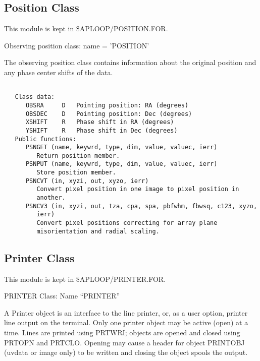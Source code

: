 \subsection{Position Class}

   This module is kept in \$APLOOP/POSITION.FOR.

   Observing position class: name = 'POSITION'

   The observing position class contains information about the
original position and any phase center shifts of the data.
{\small\begin{verbatim}

   Class data:
      OBSRA     D   Pointing position: RA (degrees)
      OBSDEC    D   Pointing position: Dec (degrees)
      XSHIFT    R   Phase shift in RA (degrees)
      YSHIFT    R   Phase shift in Dec (degrees)
   Public functions:
      PSNGET (name, keywrd, type, dim, value, valuec, ierr)
         Return position member.
      PSNPUT (name, keywrd, type, dim, value, valuec, ierr)
         Store position member.
      PSNCVT (in, xyzi, out, xyzo, ierr)
         Convert pixel position in one image to pixel position in
         another.
      PSNCV3 (in, xyzi, out, tza, cpa, spa, pbfwhm, fbwsq, c123, xyzo,
         ierr)
         Convert pixel positions correcting for array plane
         misorientation and radial scaling.
\end{verbatim}}

\subsection{Printer Class}

   This module is kept in \$APLOOP/PRINTER.FOR.

   PRINTER Class: Name ``PRINTER''

    A Printer object is an interface to the line printer, or, as a user
option, printer line output on the terminal.  Only one printer
object may be active (open) at a  time.  Lines are printed using
PRTWRI; objects are opened and closed using PRTOPN and PRTCLO.
Opening may cause a header for object PRINTOBJ (uvdata or image only)
to be written and closing the object spools the output.

